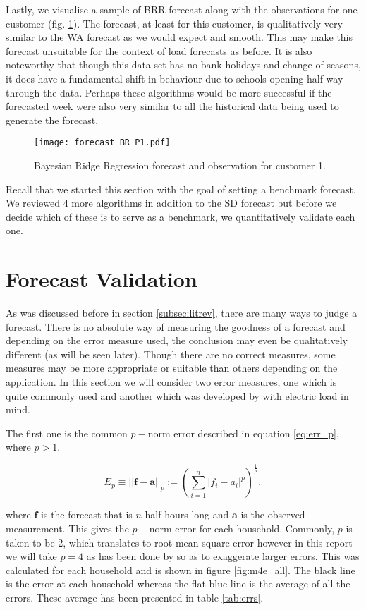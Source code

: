 Lastly, we visualise a sample of BRR forecast along with the observations for one customer (fig. \ref{fig:BR_forecast_P1}). The forecast, at least for this customer, is qualitatively very similar to the WA forecast as we would expect and smooth. This may make this forecast unsuitable for the context of load forecasts as before. It is also noteworthy that though this data set has no bank holidays and change of seasons, it does have a fundamental shift in behaviour due to schools opening half way through the data. Perhaps these algorithms would be more successful if the forecasted week were also very similar to all the historical data being used to generate the forecast.

\begin{figure}
\centering
\texttt{[image: forecast\_BR\_P1.pdf]}
\caption{Bayesian Ridge Regression forecast and observation for customer 1.}
\label{fig:BR_forecast_P1} 
\end{figure}


Recall that we started this section with the goal of setting a benchmark forecast. We reviewed 4 more algorithms in addition to the SD forecast but before we decide which of these is to serve as a benchmark, we quantitatively validate each one.

\section{Forecast Validation} \label{subsec:errs}
As was discussed before in section \ref{subsec:litrev}, there are many ways to judge a forecast. There is no absolute way of measuring the goodness of a forecast and depending on the error measure used, the conclusion may even be qualitatively different (as will be seen later). Though there are no correct measures, some measures may be more appropriate or suitable than others depending on the application. In this section we will consider two error measures, one which is quite commonly used and another which was developed by \cite{dan14} with electric load in mind.

The first one is the common $p-$norm error described in equation \ref{eq:err_p}, where $ p > 1 $.

\begin{equation}\label{eq:err_p}
E_p \equiv ||\boldsymbol{f} - \boldsymbol{a}||_p := \left( \sum_{i=1}^{n} |f_i - a_i |^p\right)^{\frac{1}{p}},
\end{equation}

where $\boldsymbol{f}$ is the forecast that is $n$ half hours long and $\boldsymbol{a}$ is the observed measurement. This gives the $p-$norm error for each household. Commonly, $p$ is taken to be 2, which translates to root mean square error however in this report we will take $p=4$ as has been done by \citet{dan14} so as to exaggerate larger errors. This was calculated for each household and is shown in figure \ref{fig:m4e_all}. The black line is the error at each household whereas the flat blue line is the average of all the errors. These average has been presented in table \ref{tab:errs}.

